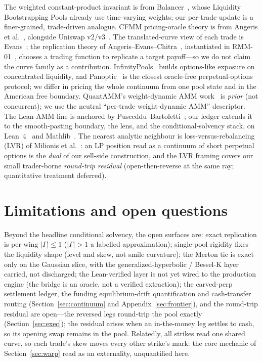 \documentclass[runningheads]{llncs}
\begin{document}
The weighted constant-product invariant is from Balancer~\cite{balancer}, whose
Liquidity Bootstrapping Pools already use time-varying weights; our per-trade
update is a finer-grained, trade-driven analogue. CFMM pricing-oracle theory is
from Angeris et al.~\cite{angeris-cfmm,angeris-uniswap}, alongside Uniswap
v2/v3~\cite{uniswapv2,uniswapv3}. The translated-curve view of each trade is
Evans~\cite{evans2020}; the replication theory of
Angeris--Evans--Chitra~\cite{angeris-replicating}, instantiated in
RMM-01~\cite{rmm01}, chooses a trading function to replicate a target payoff---so
we do not claim the curve family as a contribution. InfinityPools~%
\cite{infinitypools} builds options-like exposure on concentrated liquidity, and
Panoptic~\cite{panoptic} is the closest oracle-free perpetual-options protocol; we
differ in pricing the whole continuum from one pool state and in the American free
boundary. QuantAMM's weight-dynamic AMM work~\cite{quantamm} is \emph{prior} (not
concurrent); we use the neutral ``per-trade weight-dynamic AMM'' descriptor. The
Lean-AMM line is anchored by Pusceddu--Bartoletti~\cite{pusceddu-bartoletti}; our
ledger extends it to the smooth-pasting boundary, the lens, and the
conditional-solvency stack, on Lean~4~\cite{lean4} and Mathlib~\cite{mathlib}. The
nearest analytic neighbour is loss-versus-rebalancing (LVR) of Milionis et
al.~\cite{lvr}: an LP position read as a continuum of short perpetual options is
the \emph{dual} of our sell-side construction, and the LVR framing covers our
small trader-borne \emph{round-trip residual} (open-then-reverse at the same ray;
quantitative treatment deferred).

\section{Limitations and open questions}\label{sec:limits}
Beyond the headline conditional solvency, the open surfaces are: exact replication
is per-wing $|\Gamma|\le1$ ($|\Gamma|>1$ a labelled approximation); single-pool
rigidity fixes the liquidity shape (level and skew, not smile curvature); the
Merton tie is exact only on the Gaussian slice, with the generalized-hyperbolic /
Bessel-K layer carried, not discharged; the Lean-verified layer is not
yet wired to the production engine (the bridge is an oracle, not a verified
extraction); the carved-perp settlement ledger, the funding equilibrium-drift
quantification and cash-transfer routing
(Section~\ref{sec:continuum} and Appendix~\ref{sec:frontier}), and the round-trip residual
are open---the reversed legs round-trip the pool exactly (Section~\ref{sec:exec});
the residual arises when an in-the-money leg settles to cash, so its opening swap
remains in the pool. Relatedly, all strikes read one shared curve, so each trade's
skew moves every other strike's mark: the core mechanic of
Section~\ref{sec:warp} read as an externality, unquantified here.
\end{document}
